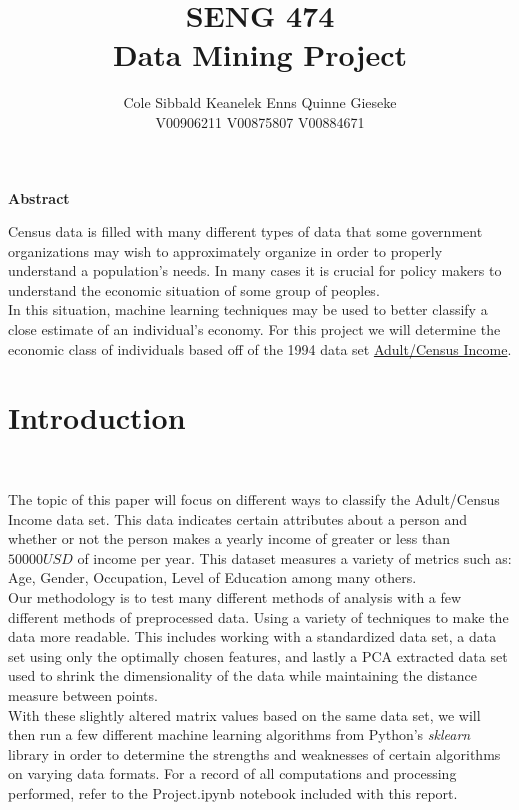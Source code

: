 \documentclass{article}
\title{SENG 474 \\ Data Mining Project\\}
\author{Cole Sibbald \quad Keanelek Enns \quad Quinne Gieseke \\V00906211     \quad V00875807     \quad V00884671}
\begin{document}
	\maketitle
	\newpage

\begin{center}	\textbf{Abstract} \end{center}

Census data is filled with many different types of data that some government organizations may wish to approximately organize in order to properly understand a population's needs. In many cases it is crucial for policy makers to understand the economic situation of some group of peoples.\\

In this situation, machine learning techniques may be used to better classify a close estimate of an individual's economy. For this project we will determine the economic class of individuals based off of the 1994 data set \href{https://archive.ics.uci.edu/ml/datasets/Adult}{Adult/Census Income}.
	\tableofcontents
	\newpage

	\section{Introduction}~

The topic of this paper will focus on different ways to classify the Adult/Census Income data set. This data indicates certain attributes about a person and whether or not the person makes a yearly income of greater or less than $ 50000USD $  of income per year. This dataset measures a variety of metrics such as: Age, Gender, Occupation, Level of Education among many others.\\
	
Our methodology is to test many different methods of analysis with a few different methods of preprocessed data. Using a variety of techniques to make the data more readable. This includes working with a standardized data set, a data set using only the optimally chosen features, and lastly a PCA extracted data set used to shrink the dimensionality of the data while maintaining the distance measure between points.\\

With these slightly altered matrix values based on the same data set, we will then run a few different machine learning algorithms from Python's \emph{sklearn} library in order to determine the strengths and weaknesses of certain algorithms on varying data formats. For a record of all computations and processing performed, refer to the Project.ipynb notebook included with this report.
\end{document}
